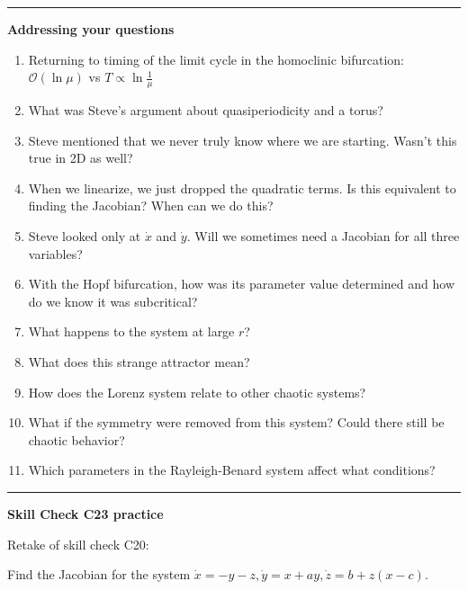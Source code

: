 \documentclass[12pt,letterpaper,noanswers]{exam}
\begin{document}
\vspace{0.2cm}
\hrule
\vspace{0.2cm}

\textbf{Addressing your questions}
\begin{enumerate}
    \item Returning to timing of the limit cycle in the homoclinic bifurcation: $\mathcal{O}(\ln \mu)$ vs $T\propto \ln \frac{1}{\mu}$
    \item What was Steve's argument about quasiperiodicity and a torus?
    \item Steve mentioned that we never truly know where we are starting.  Wasn't this true in 2D as well?
    \item When we linearize, we just dropped the quadratic terms.  Is this equivalent to finding the Jacobian?  When can we do this?
        \item Steve looked only at $\dot x$ and $\dot y$.  Will we sometimes need a Jacobian for all three variables?
        \item With the Hopf bifurcation, how was its parameter value determined and how do we know it was subcritical?
        \item What happens to the system at large $r$?
    \item What does this strange attractor mean?
    \item How does the Lorenz system relate to other chaotic systems?
    \item What if the symmetry were removed from this system?  Could there still be chaotic behavior?
    \item Which parameters in the Rayleigh-Benard system affect what conditions?

    
\end{enumerate}

\vspace{0.2cm}
\hrule
\vspace{0.2cm}


\noindent\textbf{Skill Check C23 practice}
\begin{questions}
\item Retake of skill check C20: 

\item Find the Jacobian for the system $\dot x = -y-z, \dot y = x + ay, \dot z = b + z(x-c).$

\end{questions}

\vspace{0.2cm}
\end{document}
